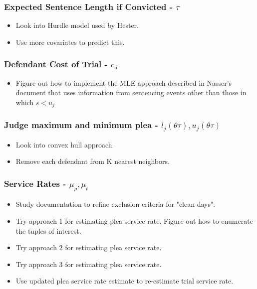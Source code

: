 \documentclass[11pt]{article}
\begin{document}
    \subsubsection{Expected Sentence Length if Convicted - $\tau$}
      \begin{itemize}
        \item Look into Hurdle model used by Hester.
        \item Use more covariates to predict this.
      \end{itemize}

    \subsubsection{Defendant Cost of Trial - $c_d$}
      \begin{itemize}
        \item Figure out how to implement the MLE approach described in Nasser's document
        that uses information from sentencing events other than those in which $s < u_j$
      \end{itemize}

    \subsubsection{Judge maximum and minimum plea - $l_j(\theta \tau),u_j(\theta \tau)$}
      \begin{itemize}
        \item Look into convex hull approach.
        \item Remove each defendant from K nearest neighbors.
      \end{itemize}

    \subsubsection{Service Rates - $\mu_p, \mu_t$}
      \begin{itemize}
        \item Study documentation to refine exclusion criteria for "clean days".
        \item Try approach 1 for estimating plea service rate. Figure out how to enumerate the tuples of interest.
        \item Try approach 2 for estimating plea service rate.
        \item Try approach 3 for estimating plea service rate.
        \item Use updated plea service rate estimate to re-estimate trial service rate.
      \end{itemize}
\end{document}
